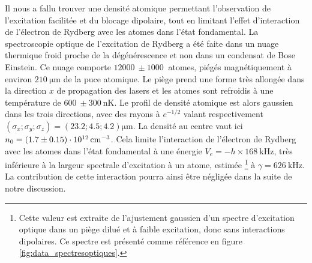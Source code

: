 Il nous a fallu trouver une densité atomique permettant l'observation de l'excitation facilitée et du blocage dipolaire, tout en limitant l'effet d'interaction de l'électron de Rydberg avec les atomes dans l'état fondamental.
La spectroscopie optique de l'excitation de Rydberg a été faite dans un nuage thermique froid proche de la dégénérescence et non dans un condensat de Bose Einstein.
Ce nuage comporte $\SI{12000}{} \pm \SI{1000}{}$ atomes, piégés magnétiquement à environ $\SI{210}{\um}$ de la puce atomique.
Le piège prend une forme très allongée dans la direction $x$ de propagation des lasers et les atomes sont refroidis à une température de $\SI{600}{} \pm \SI{300}{\nano\kelvin}$.
Le profil de densité atomique est alors gaussien dans les trois directions, avec des rayons à $e^{-1/2}$ valant respectivement $(\sigma_x;\sigma_y;\sigma_z) = (\num{23.2} ; \num{4.5} ; \num{4.2})\si{\um}$.
La densité au centre vaut ici $n_0 = (\num{1.7}\pm\SI{0.15}{})\cdot \SI{e12}{\per\raiseto{3}\cm}$.
Cela limite l'interaction de l'électron de Rydberg avec les atomes dans l'état fondamental à une énergie $V_e = -h\times\SI{168}{\kHz}$, très inférieure à la largeur spectrale d'excitation à un atome, estimée \footnote{
Cette valeur est extraite de l'ajustement gaussien d'un spectre d'excitation optique dans un piège dilué et à faible excitation, donc sans interactions dipolaires.
Ce spectre est présenté comme référence en figure \eqref{fig:data_spectresoptiques}.}
à $\gamma = \SI{626}{\kHz}$.
La contribution de cette interaction pourra ainsi être négligée dans la suite de notre discussion.


